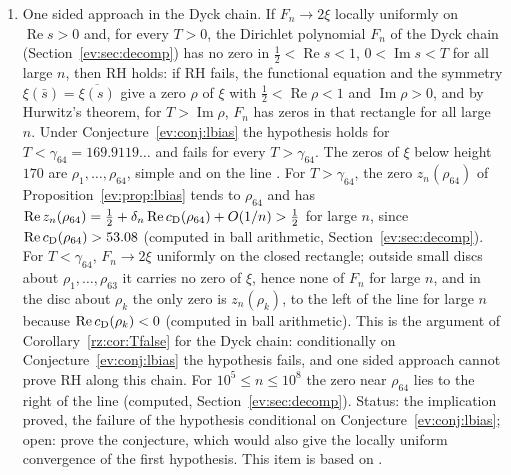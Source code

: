 \begin{enumerate}
\item \begin{resultpar}\label{ev:res:dyckside}One sided approach in the Dyck chain. If $F_n\to2\xi$ locally uniformly on $\operatorname{Re}s>0$ and, for every $T>0$, the Dirichlet polynomial $F_n$ of the Dyck chain (Section~\ref{ev:sec:decomp}) has no zero in $\tfrac12<\operatorname{Re}s<1$, $0<\operatorname{Im}s<T$ for all large $n$, then RH holds: if RH fails, the functional equation and the symmetry $\xi(\bar s)=\overline{\xi(s)}$ give a zero $\rho$ of $\xi$ with $\tfrac12<\operatorname{Re}\rho<1$ and $\operatorname{Im}\rho>0$, and by Hurwitz's theorem, for $T>\operatorname{Im}\rho$, $F_n$ has zeros in that rectangle for all large $n$. Under Conjecture~\ref{ev:conj:lbias} the hypothesis holds for $T<\gamma_{64}=169.9119\ldots$ and fails for every $T>\gamma_{64}$. The zeros of $\xi$ below height $170$ are $\rho_1,\dots,\rho_{64}$, simple and on the line \cite{LRW86}. For $T>\gamma_{64}$, the zero $z_n(\rho_{64})$ of Proposition~\ref{ev:prop:lbias} tends to $\rho_{64}$ and has $\operatorname{Re}z_n(\rho_{64})=\tfrac12+\delta_n\operatorname{Re}c_{\rm D}(\rho_{64})+O(1/n)>\tfrac12$ for large $n$, since $\operatorname{Re}c_{\rm D}(\rho_{64})>53.08$ (computed in ball arithmetic, Section~\ref{ev:sec:decomp}). For $T<\gamma_{64}$, $F_n\to2\xi$ uniformly on the closed rectangle; outside small discs about $\rho_1,\dots,\rho_{63}$ it carries no zero of $\xi$, hence none of $F_n$ for large $n$, and in the disc about $\rho_k$ the only zero is $z_n(\rho_k)$, to the left of the line for large $n$ because $\operatorname{Re}c_{\rm D}(\rho_k)<0$ (computed in ball arithmetic). This is the argument of Corollary~\ref{rz:cor:Tfalse} for the Dyck chain: conditionally on Conjecture~\ref{ev:conj:lbias} the hypothesis fails, and one sided approach cannot prove RH along this chain. For $10^5\le n\le10^8$ the zero near $\rho_{64}$ lies to the right of the line (computed, Section~\ref{ev:sec:decomp}). Status: the implication proved, the failure of the hypothesis conditional on Conjecture~\ref{ev:conj:lbias}; open: prove the conjecture, which would also give the locally uniform convergence of the first hypothesis. This item is based on \cite{P26excursion,P26lbias}.\end{resultpar}
\end{enumerate}
